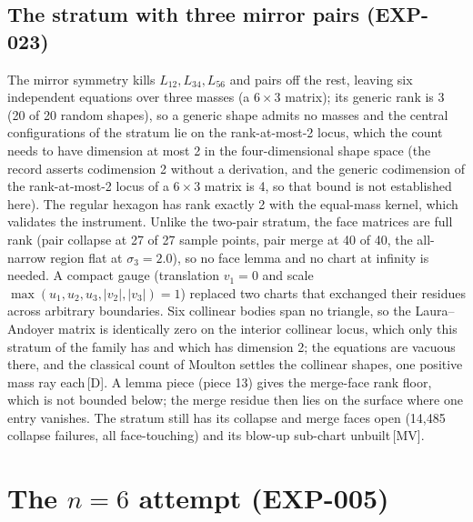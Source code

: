 \documentclass[11pt]{article}
\theoremstyle{definition}
\theoremstyle{remark}
\newcommand{\mk}[1]{\,{\scriptsize[#1]}}
\newcommand{\MV}{\mk{MV}}
\newcommand{\Dm}{\mk{D}}
\begin{document}
\subsection{The stratum with three mirror pairs (EXP-023)}

The mirror symmetry kills $L_{12},L_{34},L_{56}$ and pairs off the rest, leaving six independent equations over three
masses (a $6\times3$ matrix); its generic rank is 3 (20 of 20 random shapes), so a generic shape admits no masses and the central configurations of the stratum lie on the rank-at-most-2 locus, which the count needs to have dimension at most 2 in the four-dimensional shape space (the record asserts codimension 2
without a derivation, and the generic codimension of the rank-at-most-2 locus of a $6\times3$ matrix is 4, so that bound is not established here).
The regular hexagon has rank exactly 2 with the equal-mass kernel, which validates the instrument. Unlike the two-pair stratum,
the face matrices are full rank (pair collapse at 27 of 27 sample points, pair merge at 40 of 40, the all-narrow region flat at
$\sigma_3=2.0$), so no face lemma and no chart at infinity is needed. A compact gauge (translation $v_1=0$ and scale
$\max(u_1,u_2,u_3,|v_2|,|v_3|)=1$) replaced two charts that exchanged their residues across arbitrary boundaries. Six collinear
bodies span no triangle, so the Laura--Andoyer matrix is identically zero on the interior collinear locus, which only this stratum
of the family has and which has dimension 2; the equations are vacuous there, and the classical count of Moulton \cite{Moulton10}
settles the collinear shapes, one positive mass ray each\Dm. A lemma piece (piece 13) gives the merge-face rank floor, which
is not bounded below; the merge residue then lies on the surface where one entry vanishes. The stratum still has its collapse and
merge faces open (14,485 collapse failures, all face-touching) and its blow-up sub-chart unbuilt\MV.

\section{The \texorpdfstring{$n=6$}{n=6} attempt (EXP-005)}\label{sec:six}
\end{document}
